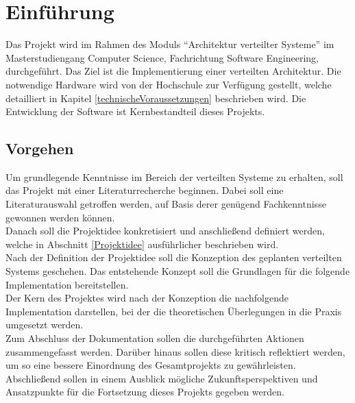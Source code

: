 \chapter{Einführung}
Das Projekt wird im Rahmen des Moduls \enquote{Architektur verteilter Systeme} im Masterstudiengang Computer Science, Fachrichtung Software Engineering, durchgeführt.  Das Ziel ist die Implementierung einer verteilten Architektur. Die notwendige Hardware wird von der Hochschule zur Verfügung gestellt, welche detailliert in Kapitel \ref{technischeVoraussetzungen} beschrieben wird.
Die Entwicklung der Software ist Kernbestandteil dieses Projekts. 

 \section{Vorgehen}
Um grundlegende Kenntnisse im Bereich der verteilten Systeme zu erhalten, soll das Projekt mit einer Literaturrecherche beginnen. Dabei soll eine Literaturauswahl getroffen werden, auf Basis derer genügend Fachkenntnisse gewonnen werden können. \\
Danach soll die Projektidee konkretisiert und anschließend definiert werden, welche in Abschnitt \ref{Projektidee} ausführlicher beschrieben wird.\\
Nach der Definition der Projektidee soll die Konzeption des geplanten verteilten Systems geschehen. Das entstehende Konzept soll die Grundlagen für die folgende Implementation bereitstellen. \\
Der Kern des Projektes wird nach der Konzeption die nachfolgende Implementation darstellen, bei der die theoretischen Überlegungen in die Praxis umgesetzt werden. \\
Zum Abschluss der Dokumentation sollen die durchgeführten Aktionen zusammengefasst werden. Darüber hinaus sollen diese kritisch reflektiert werden, um so eine bessere Einordnung des Gesamtprojekts zu gewährleisten. Abschließend sollen in einem Ausblick mögliche Zukunftsperspektiven und Ansatzpunkte für die Fortsetzung dieses Projekts gegeben werden. 

